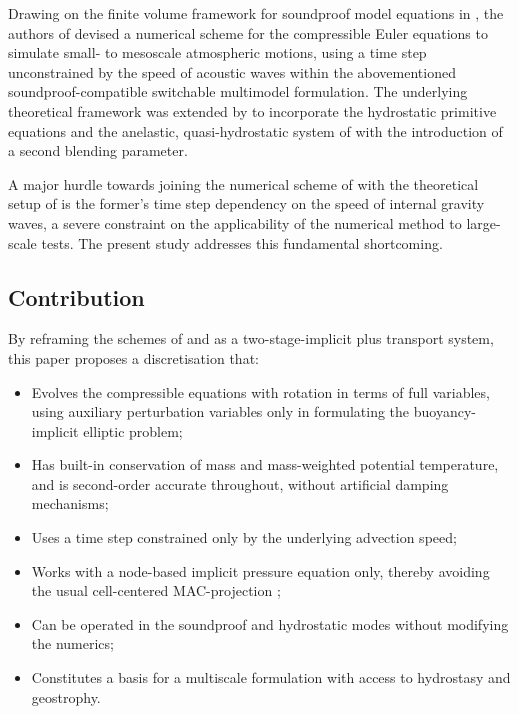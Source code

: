 \documentclass{ametsoc}
\theoremstyle{definition}
\begin{document}
Drawing on the finite volume framework for soundproof model equations in \citet{KleinTCFD2009}, the authors of \citet{Benacchio2014, BenacchioEtAl2014} devised a numerical scheme for the compressible Euler equations to simulate small- to mesoscale atmospheric motions, using a time step unconstrained by the speed of acoustic waves within the abovementioned soundproof-compatible switchable multimodel formulation. The underlying theoretical framework was extended by \citet{KleinBenacchio2016} to incorporate the hydrostatic primitive equations and the anelastic, quasi-hydrostatic system of \cite{ArakawaKonor2009} with the introduction of a second blending parameter.

A major hurdle towards joining the numerical scheme of \cite{BenacchioEtAl2014} with the theoretical setup of \cite{KleinBenacchio2016} is the former's time step dependency on the speed of internal gravity waves, a severe constraint on the applicability of the numerical method to large-scale tests. The present study addresses this fundamental shortcoming. 

\subsection{Contribution}

By reframing the schemes of \cite{KleinTCFD2009} and \cite{BenacchioEtAl2014} as a two-stage-implicit plus transport system, this paper proposes a discretisation that:
%
\begin{itemize}
\item Evolves the compressible equations with rotation in terms of full variables, using auxiliary perturbation variables only in formulating the buoyancy-implicit elliptic problem;
\item Has built-in conservation of mass and mass-weighted potential temperature, and is second-order accurate throughout, without artificial damping mechanisms;
\item Uses a time step constrained only by the underlying advection speed;
\item Works with a node-based implicit pressure equation only, thereby avoiding the usual cell-centered MAC-projection \citep[see][and references therein]{AlmgrenEtAl1998}; 
\item Can be operated in the soundproof and hydrostatic modes without modifying the numerics;
\item Constitutes a basis for a multiscale formulation with access to hydrostasy and geostrophy.
\end{itemize}
\end{document}
